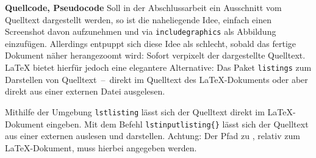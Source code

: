 %
%
\textbf{Quellcode, Pseudocode}
\label{sec:listing}
%
%
Soll in der Abschlussarbeit ein Ausschnitt vom Quelltext dargestellt werden, so ist die naheliegende Idee, einfach einen Screenshot davon aufzunehmen und via \texttt{\tb includegraphics} als Abbildung einzufügen. Allerdings entpuppt sich diese Idee als schlecht, sobald das fertige Dokument näher herangezoomt wird: Sofort verpixelt der dargestellte Quelltext. \LaTeX{} bietet hierfür jedoch eine elegantere Alternative: Das Paket \texttt{listings} zum Darstellen von Quelltext~--~direkt im Quelltext des \LaTeX-Dokuments oder aber direkt aus einer externen Datei ausgelesen.

Mithilfe der Umgebung \texttt{lstlisting} lässt sich der Quelltext direkt im \LaTeX-Dokument eingeben. Mit dem Befehl \texttt{\tb lstinputlisting\{\}} lässt sich der Quelltext aus einer externen  auslesen und darstellen. Achtung: Der Pfad zu , relativ zum \LaTeX-Dokument, muss hierbei angegeben werden.

